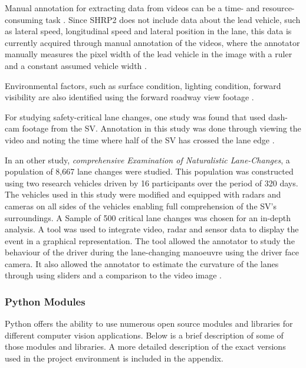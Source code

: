 Manual annotation for extracting data from videos can be a time- and resource-consuming task \cite{schreiner2007semi}. Since SHRP2 does not include data about the lead vehicle, such as lateral speed, longitudinal speed and lateral position in the lane, this data is currently acquired through manual annotation of the videos, where the annotator manually measures the pixel width of the lead vehicle in the image with a ruler and a constant assumed vehicle width \cite{bargman2013using}. 

Environmental factors, such as surface condition, lighting condition, forward visibility are also identified using the forward roadway view footage \cite{hallmark2015evaluation}. 

For studying safety-critical lane changes, one study was found that used dash-cam footage from the SV. Annotation in this study was done through viewing the video and noting the time where half of the SV has crossed the lane edge \cite{beggiato2013sequence}.

In an other study, \textit{comprehensive Examination of Naturalistic Lane-Changes}, a population of 8,667 lane changes were studied. This population was constructed using two research vehicles driven by 16 participants over the period of 320 days. The vehicles used in this study were modified and equipped with radars and cameras on all sides of the vehicles enabling full comprehension of the SV's surroundings. A Sample of 500 critical lane changes was chosen for an in-depth analysis. A tool was used to integrate video, radar and sensor data to display the event in a graphical representation. The tool allowed the annotator to study the behaviour of the driver during the lane-changing manoeuvre using the driver face camera. It also allowed the annotator to estimate the curvature of the lanes through using sliders and a comparison to the video image \cite{lee2004comprehensive}. 



\subsubsection{Python Modules}

Python offers the ability to use numerous open source modules and libraries for different computer vision applications. Below is a brief description of some of those  modules and libraries. A more detailed description of the exact versions used in the project environment is included in the appendix.


